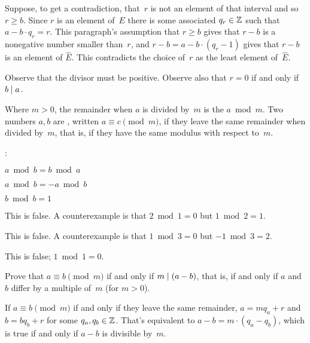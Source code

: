 \documentclass{ibl}  %
\begin{document}
\begin{problem}
\begin{exes}
\begin{answer}
  Suppose, to get a contradiction, that~$r$ is not 
  an element of that interval and so $r\geq b$.
  Since $r$ is an element of~$E$ there is some associated
  $q_r\in\mathbb{Z}$ such that $a-b\cdot q_r=r$.
  This paragraph's assumption that $r\geq b$
  gives that $r-b$ is a nonegative number smaller than~$r$, and
  $r-b=a-b\cdot (q_r-1)$ gives that $r-b$ is an element of $\hat{E}$.
  This contradicts the choice of~$r$ as the least element of~$\hat{E}$.
\end{answer}
\end{exes}
\end{problem}

\noindent 
Observe that the divisor must be positive.
Observe also that $r=0$ if and only if $b\mid a$. 

\begin{df}
Where $m>0$, the remainder when $a$ is divided by~$m$ is
the  $a\bmod m$.
Two numbers $a,b$ are , 
written $a\equiv c\pmod m$, 
if they leave the same remainder when divided by~$m$, that is,
if they have the same modulus with respect to~$m$.
\end{df}

\begin{problem}[\midlength]  \pord:
\begin{items}
\item $a\bmod b=b\bmod a$
\item $a\bmod b=-a\bmod b$
\item $b\bmod b=1$
\end{items}
\begin{ans}
\begin{exes}
\item This is false.
  A counterexample is that $2\bmod 1=0$ but $1\bmod 2=1$.
\item This is false.
  A counterexample is that $1\bmod 3=0$ but $-1\bmod 3=2$.
\item This is false;
  $1\bmod 1=0$.     
\end{exes}
\end{ans}
\end{problem}

\begin{problem} \label{ex:AEquivBpmodMIFFABDifferBYMultipleOfM}
Prove that $a\equiv b\pmod m$ if and only if $m\mid (a-b)$,
that is, if and only if $a$ and~$b$ differ by a multiple of~$m$
(for $m>0$).  
\begin{answer}
If $a\equiv b\pmod m$ if and only if they leave the same remainder,
$a=mq_a+r$ and~$b=bq_b+r$ for some $q_a,q_b\in\mathbb{Z}$.
That's equivalent to $a-b=m\cdot(q_a-q_b)$, 
which is true if and only if $a-b$ is divisible by~$m$.
\end{answer}
\end{problem}
\end{document}
